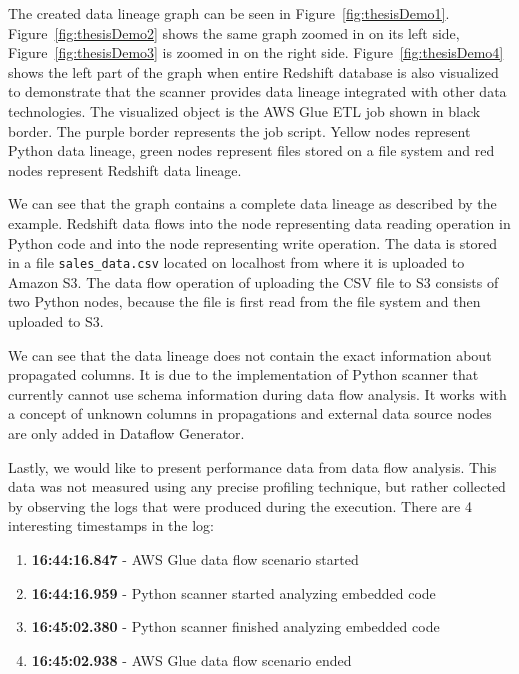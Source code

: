\par
The created data lineage graph can be seen in Figure~\ref{fig:thesisDemo1}. Figure~\ref{fig:thesisDemo2} shows the same graph zoomed in on its left side, Figure~\ref{fig:thesisDemo3} is zoomed in on the right side. Figure~\ref{fig:thesisDemo4} shows the left part of the graph when entire Redshift database is also visualized to demonstrate that the scanner provides data lineage integrated with other data technologies. The visualized object is the AWS Glue ETL job shown in black border. The purple border represents the job script. Yellow nodes represent Python data lineage, green nodes represent files stored on a file system and red nodes represent Redshift data lineage.
\par
We can see that the graph contains a complete data lineage as described by the example. Redshift data flows into the node representing data reading operation in Python code and into the node representing write operation. The data is stored in a file \texttt{sales\_data.csv} located on localhost from where it is uploaded to Amazon S3. The data flow operation of uploading the CSV file to S3 consists of two Python nodes, because the file is first read from the file system and then uploaded to S3.
\par
We can see that the data lineage does not contain the exact information about propagated columns. It is due to the implementation of Python scanner that currently cannot use schema information during data flow analysis. It works with a concept of unknown columns in propagations and external data source nodes are only added in Dataflow Generator.
\par
Lastly, we would like to present performance data from data flow analysis. This data was not measured using any precise profiling technique, but rather collected by observing the logs that were produced during the execution. There are 4 interesting timestamps in the log:
\begin{enumerate}
    \item \textbf{16:44:16.847} - AWS Glue data flow scenario started
    \item \textbf{16:44:16.959} - Python scanner started analyzing embedded code
    \item \textbf{16:45:02.380} - Python scanner finished analyzing embedded code
    \item \textbf{16:45:02.938} - AWS Glue data flow scenario ended
\end{enumerate}
